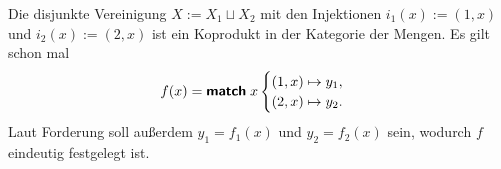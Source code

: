 \noindent
Die disjunkte Vereinigung $X:=X_1\sqcup X_2$ mit den Injektionen
$i_1(x):=(1,x)$ und $i_2(x):=(2,x)$ ist ein Koprodukt in der
Kategorie der Mengen. Es gilt schon mal
\[f(x) = \textsf{\textbf{match}}\; x \begin{cases}
(1,x)\mapsto y_1,\\
(2,x)\mapsto y_2.
\end{cases}\]
Laut Forderung soll außerdem $y_1 = f_1(x)$ und $y_2 = f_2(x)$ sein,
wodurch $f$ eindeutig festgelegt ist.
